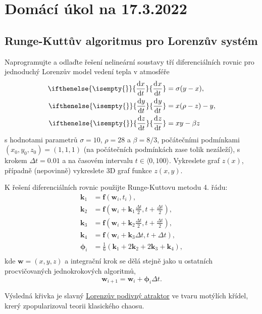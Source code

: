 \documentclass[a4paper,11pt,twoside]{article}
\def\vector#1{\boldsymbol{#1}}								%
\renewcommand{\d}{\mathrm{d}}
\newcommand{\derivative}[3][]{\ifthenelse{\isempty{#1}}	    %
	{\frac{\d{#2}}{\d{#3}}}
	{\frac{\d^{#1}{#2}}{\d{#3}^{#1}}}
}
\begin{document}
\section*{Domácí úkol na 17.3.2022}
\subsection*{Runge-Kuttův algoritmus pro Lorenzův systém}
Naprogramujte a odlaďte řešení nelineární soustavy tří diferenciálních rovnic pro jednoduchý Lorenzův model vedení tepla v atmosféře
\begin{align}
    \derivative{x}{t}&=\sigma(y-x),\nonumber\\
    \derivative{y}{t}&=x(\rho-z)-y,\nonumber\\
    \derivative{z}{t}&=xy-\beta z\nonumber
\end{align}
s hodnotami parametrů $\sigma=10$, $\rho=28$ a $\beta=8/3$, počátečními podmínkami $(x_0, y_0, z_0)=(1,1,1)$ (na počátečních podmínkách zase tolik nezáleží), s krokem $\Delta t=0.01$ a na časovém intervalu $t\in\langle0,100\rangle$.
Vykreslete graf $z(x)$, případně (nepovinně) vykreslete 3D graf funkce $z(x,y)$.

K řešení diferenciálních rovnic použijte Runge-Kuttovu metodu 4. řádu:
\begin{align*}
    \vector{k}_{1}&=\vector{f}(\vector{w}_{i},t_{i}),\\
    \vector{k}_{2}&=\vector{f}\left(\vector{w}_{i}+\vector{k}_{1}\frac{\Delta t}{2},t+\frac{\Delta t}{2}\right),\\
    \vector{k}_{3}&=\vector{f}\left(\vector{w}_{i}+\vector{k}_{2}\frac{\Delta t}{2},t+\frac{\Delta t}{2}\right),\\
    \vector{k}_{4}&=\vector{f}\left(\vector{w}_{i}+\vector{k}_{3}\Delta t,t+\Delta t\right),\\
    \vector{\phi}_{i}&=\frac{1}{6}\left(\vector{k}_{1}+2\vector{k}_{2}+2\vector{k}_{3}+\vector{k}_{4}\right),\\
\end{align*}
kde $\vector{w}=(x,y,z)$ a integrační krok se dělá stejně jako u ostatních procvičovaných jednokrokových algoritmů,
\begin{equation*}
    \vector{w}_{i+1}=\vector{w}_{i}+\vector{\phi}_{i}\Delta t.
\end{equation*}

Výsledná křivka je slavný \href{https://cs.wikipedia.org/wiki/Lorenz%C5%AFv_atraktor}{Lorenzův podivný atraktor} ve tvaru motýlích křídel, krerý zpopularizoval teorii klasického chaosu.
\end{document}
